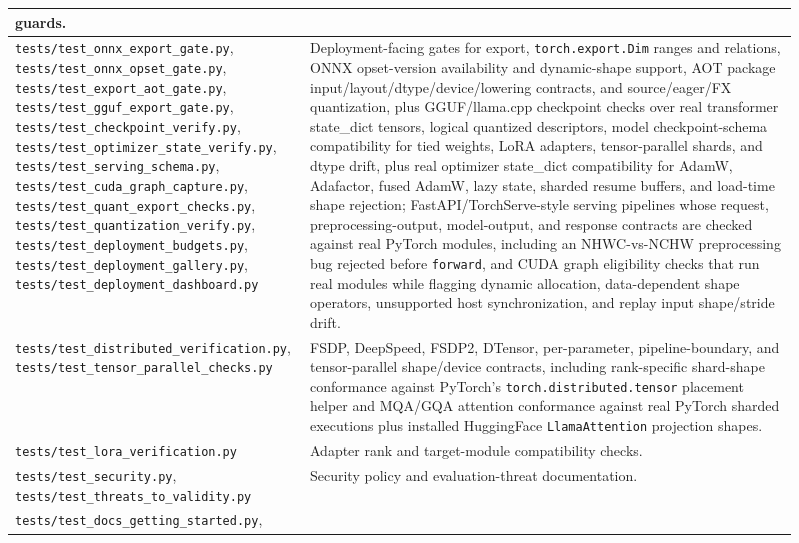 \documentclass[11pt]{article}
\begin{document}
\begin{longtable}{|p{0.30\linewidth}|p{0.61\linewidth}|}
guards. \\
\hline
\texttt{tests/test\_onnx\_export\_gate.py},
\texttt{tests/test\_onnx\_opset\_gate.py},
\texttt{tests/test\_export\_aot\_gate.py},
\texttt{tests/test\_gguf\_export\_gate.py},
\texttt{tests/test\_checkpoint\_verify.py},
\texttt{tests/test\_optimizer\_state\_verify.py},
\texttt{tests/test\_serving\_schema.py},
\texttt{tests/test\_cuda\_graph\_capture.py},
\texttt{tests/test\_quant\_export\_checks.py},
\texttt{tests/test\_quantization\_verify.py},
\texttt{tests/test\_deployment\_budgets.py},
\texttt{tests/test\_deployment\_gallery.py},
\texttt{tests/test\_deployment\_dashboard.py} &
Deployment-facing gates for export, \texttt{torch.export.Dim} ranges and
relations, ONNX opset-version availability and dynamic-shape support, AOT
package input/layout/dtype/device/lowering contracts, and source/eager/FX
quantization, plus GGUF/llama.cpp checkpoint checks over real transformer
state\_dict tensors, logical quantized descriptors, model checkpoint-schema
compatibility for tied weights, LoRA adapters, tensor-parallel shards, and
dtype drift, plus real optimizer state\_dict compatibility for AdamW, Adafactor,
fused AdamW, lazy state, sharded resume buffers, and load-time shape rejection;
FastAPI/TorchServe-style serving pipelines whose request, preprocessing-output,
model-output, and response contracts are checked against real PyTorch modules,
including an NHWC-vs-NCHW preprocessing bug rejected before \texttt{forward},
and CUDA graph eligibility checks that run real modules while flagging dynamic
allocation, data-dependent shape operators, unsupported host synchronization,
and replay input shape/stride drift. \\
\hline
\texttt{tests/test\_distributed\_verification.py},
\texttt{tests/test\_tensor\_parallel\_checks.py} &
FSDP, DeepSpeed, FSDP2, DTensor, per-parameter, pipeline-boundary, and
tensor-parallel shape/device contracts, including rank-specific shard-shape
conformance against PyTorch's \texttt{torch.distributed.tensor} placement helper
and MQA/GQA attention conformance against real PyTorch sharded executions plus
installed HuggingFace \texttt{LlamaAttention} projection shapes. \\
\hline
\texttt{tests/test\_lora\_verification.py} &
Adapter rank and target-module compatibility checks. \\
\hline
\texttt{tests/test\_security.py},
\texttt{tests/test\_threats\_to\_validity.py} &
Security policy and evaluation-threat documentation. \\
\hline
\texttt{tests/test\_docs\_getting\_started.py},

\end{longtable}
\end{document}
